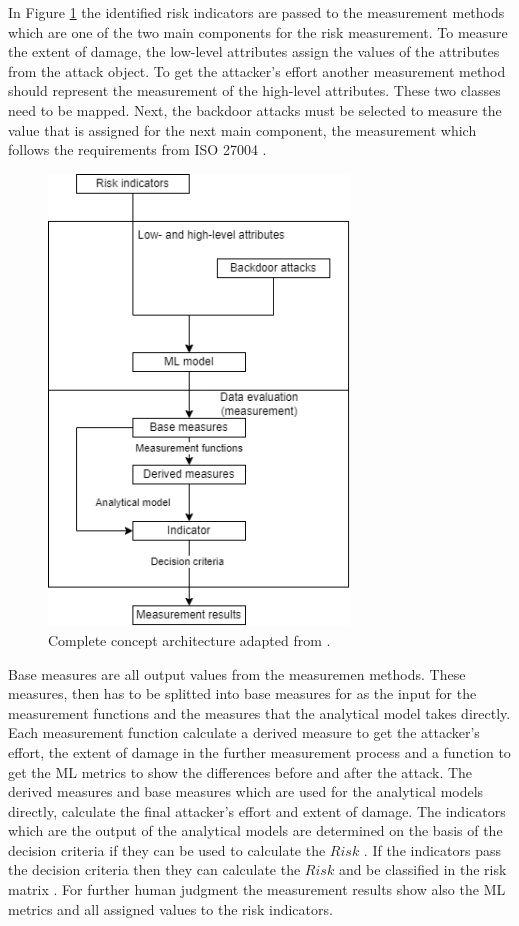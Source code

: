 In Figure \ref{fig:complete_architecture} the identified risk indicators are passed to the measurement methods which are one of the two main components for the risk measurement. To measure the extent of damage, the low-level attributes assign the values of the attributes from the attack object. To get the attacker's effort another measurement method should represent the measurement of the high-level attributes. These two classes need to be mapped. Next, the backdoor attacks must be selected to measure the value that is assigned for the next main component, the measurement which follows the requirements from ISO 27004 \cite{ISO_27004_2009}.

\begin{figure}[ht!]
  \centering
  \includegraphics[width=8cm]{pictures/complete_architecture.png}
  \caption{Complete concept architecture adapted from \cite{ISO_27004_2009}.}
  \label{fig:complete_architecture}
\end{figure}

Base measures are all output values from the measuremen methods. These measures, then has to be splitted into base measures for as the input for the measurement functions and the measures that the analytical model takes directly. Each measurement function calculate a derived measure to get the attacker's effort, the extent of damage in the further measurement process and a function to get the ML metrics to show the differences before and after the attack. The derived measures and base measures which are used for the analytical models directly, calculate the final attacker's effort and extent of damage. The indicators which are the output of the analytical models are determined on the basis of the decision criteria if they can be used to calculate the $Risk$ \cite{DBLP:journals/access/JianxingHSH21}. If the indicators pass the decision criteria then they can calculate the $Risk$ and be classified in the risk matrix \cite{Ivanenko2020IMPLEMENTATIONOR}. For further human judgment the measurement results show also the ML metrics and all assigned values to the risk indicators.


